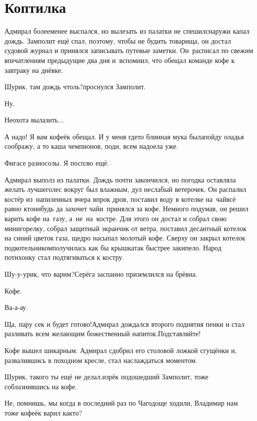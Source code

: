\chapter{Коптилка}
\vepsianrose

Адмирал более\sdash менее выспался, но вылезать из палатки не спешил\mdash снаружи капал дождь. Замполит ещё спал, поэтому, чтобы не будить товарища, он достал судовой журнал и принялся записывать путевые заметки. Он~расписал по свежим впечатлениям предыдущие два дня и~вспомнил, что обещал команде кофе к завтраку на днёвке.

\diagdash Шурик, там дождь чтоль?\mdash проснулся Замполит.

\diagdash Ну.

\diagdash Неохота вылазить$\ldots$

\diagdash А надо! Я вам кофеёк обещал. И у меня где\sdash то блинная мука была\mdash пойду оладья соображу, а то каша чемпионов, поди, всем надоела уже.

\diagdash Фигасе разносолы. Я посплю ещё.

Адмирал выполз из палатки. Дождь почти закончился, но погодка оставляла желать лучшего\mdash лес вокруг был влажным, дул неслабый ветерочек. Он распалил костёр из~напиленных вчера впрок дров, поставил воду в котелке на~чай\mdash всё равно кто\sdash нибудь да захочет чай\mdash и~принялся за кофе. Немного подумав, он решил варить кофе на~газу, а~не~на~костре. Для этого он достал и собрал свою мини\sdash горелку, собрал защитный экранчик от ветра, поставил десантный котелок на синий цветок газа, щедро насыпал молотый кофе. Сверху он закрыл котелок подкотельником\mdash получилась как бы крышка\mdash так быстрее закипело. Народ потихонку стал подтягиваться к костру.

\diagdash Шу-у-урик, что варим?\mdash Серёга заспанно приземлился на брёвна.

\diagdash Кофе.

\diagdash Ва-а-ау.

\diagdash Ща, пару сек и будет готово!\mdash Адмирал дождался второго поднятия пенки и стал разливать всем желающим божественный напиток.\mdash Подставляйте!

Кофе вышел шикарным. Адмирал сдобрил его столовой ложкой сгущёнки и, развалившись в походном кресле, стал наслаждаться моментом.

\diagdash Шурик, такого ты ещё не делал.\mdash изрёк подошедший Замполит, тоже соблазнившись на кофе.

\diagdash Не, помнишь, мы когда в последний раз по Чагодоще ходили, Владимир нам тоже кофеёк варил как\sdash то?

